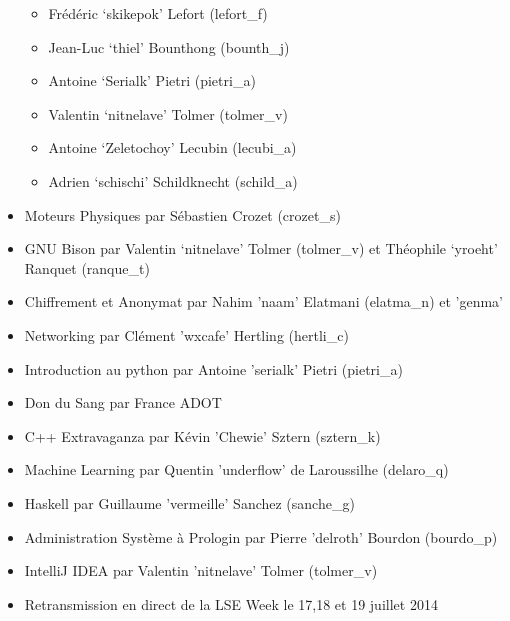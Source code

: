 \documentclass[12pt]{report}
\begin{document}
\begin{itemize}
\begin{itemize}
        \item Frédéric `skikepok' Lefort (lefort\_f)
        \item Jean-Luc `thiel' Bounthong (bounth\_j)
        \item Antoine `Serialk' Pietri (pietri\_a)
        \item Valentin `nitnelave' Tolmer (tolmer\_v)
        \item Antoine `Zeletochoy' Lecubin (lecubi\_a)
        \item Adrien `schischi' Schildknecht (schild\_a)
      \end{itemize}
    \item Moteurs Physiques par Sébastien Crozet (crozet\_s)
    \item GNU Bison par Valentin `nitnelave' Tolmer (tolmer\_v) et Théophile `yroeht' Ranquet (ranque\_t)
    \item Chiffrement et Anonymat par Nahim 'naam' Elatmani (elatma\_n) et 'genma'
    \item Networking par Clément 'wxcafe' Hertling (hertli\_c)
    \item Introduction au python par Antoine 'serialk' Pietri (pietri\_a)
    \item Don du Sang par France ADOT
    \item C++ Extravaganza par Kévin 'Chewie' Sztern (sztern\_k)
    \item Machine Learning par Quentin 'underflow' de Laroussilhe (delaro\_q)
    \item Haskell par Guillaume 'vermeille' Sanchez (sanche\_g)
    \item Administration Système à Prologin par Pierre 'delroth' Bourdon
            (bourdo\_p)
    \item IntelliJ IDEA par Valentin 'nitnelave' Tolmer (tolmer\_v)
    \item Retransmission en direct de la LSE Week le 17,18 et 19 juillet 2014
  \end{itemize}
\end{document}
